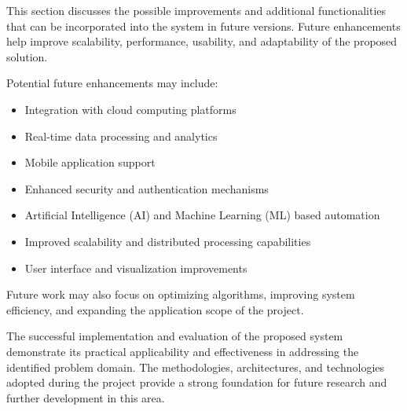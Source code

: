 This section discusses the possible improvements and additional functionalities that can be incorporated into the system in future versions. Future enhancements help improve scalability, performance, usability, and adaptability of the proposed solution.

Potential future enhancements may include:
\begin{itemize}
    \item Integration with cloud computing platforms
    \item Real-time data processing and analytics
    \item Mobile application support
    \item Enhanced security and authentication mechanisms
    \item Artificial Intelligence (AI) and Machine Learning (ML) based automation
    \item Improved scalability and distributed processing capabilities
    \item User interface and visualization improvements
\end{itemize}

Future work may also focus on optimizing algorithms, improving system efficiency, and expanding the application scope of the project.


\vspace{1cm}

The successful implementation and evaluation of the proposed system demonstrate its practical applicability and effectiveness in addressing the identified problem domain. The methodologies, architectures, and technologies adopted during the project provide a strong foundation for future research and further development in this area.